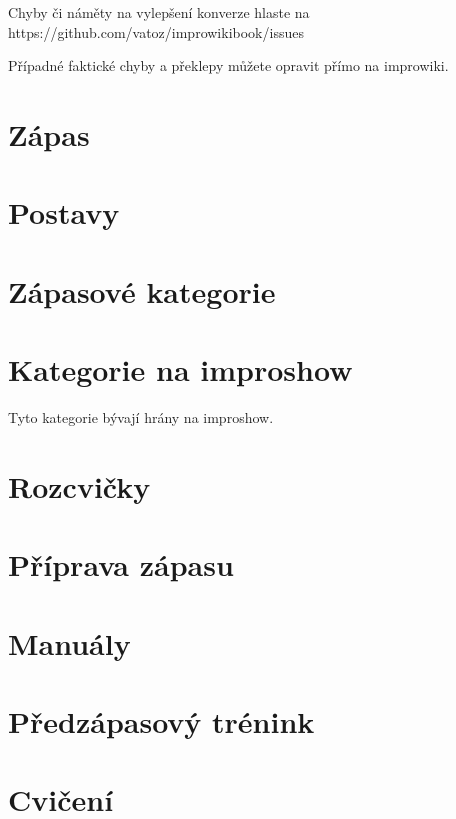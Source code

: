 \documentclass[a4paper,10pt,openany]{book}
\begin{document}
Chyby či náměty na vylepšení konverze hlaste na https://github.com/vatoz/improwikibook/issues

Případné faktické chyby a překlepy můžete opravit přímo na improwiki.
\chapter{Zápas}







\chapter{Postavy}



\chapter{Zápasové kategorie}
\label{zápasové kategorie}
\label{:kategorie:zápasové kategorie}



\chapter{Kategorie na improshow}\label{další kategorie}
\label{:kategorie:kategorie na improshow}
Tyto kategorie bývají hrány na improshow.


\chapter{Rozcvičky}\label{rozcvičky}
\label{:kategorie:rozcvičky}





\chapter{Příprava zápasu}


\chapter{Manuály}

\chapter{Předzápasový trénink}


\chapter{Cvičení}

\end{document}
